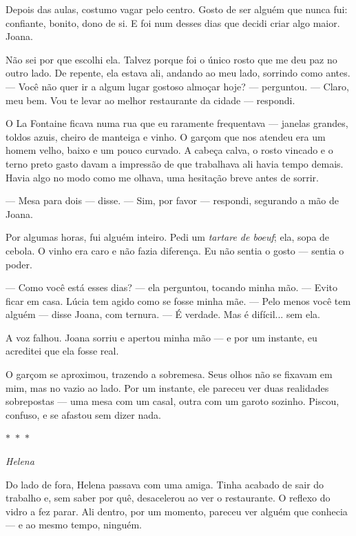 \medskip

Depois das aulas, costumo vagar pelo centro.  
Gosto de ser alguém que nunca fui: confiante, bonito, dono de si.  
E foi num desses dias que decidi criar algo maior.  
Joana.

Não sei por que escolhi ela. Talvez porque foi o único rosto que me deu paz no outro lado.  
De repente, ela estava ali, andando ao meu lado, sorrindo como antes.  
— Você não quer ir a algum lugar gostoso almoçar hoje? — perguntou.  
— Claro, meu bem. Vou te levar ao melhor restaurante da cidade — respondi.

\medskip

O La Fontaine ficava numa rua que eu raramente frequentava — janelas grandes, toldos azuis, cheiro de manteiga e vinho.  
O garçom que nos atendeu era um homem velho, baixo e um pouco curvado. A cabeça calva, o rosto vincado e o terno preto gasto davam a impressão de que trabalhava ali havia tempo demais.
Havia algo no modo como me olhava, uma hesitação breve antes de sorrir.

— Mesa para dois — disse.  
— Sim, por favor — respondi, segurando a mão de Joana.

Por algumas horas, fui alguém inteiro.  
Pedi um \emph{tartare de boeuf}; ela, sopa de cebola.  
O vinho era caro e não fazia diferença.  
Eu não sentia o gosto — sentia o poder.

— Como você está esses dias? — ela perguntou, tocando minha mão.  
— Evito ficar em casa. Lúcia tem agido como se fosse minha mãe.  
— Pelo menos você tem alguém — disse Joana, com ternura.  
— É verdade. Mas é difícil... sem ela.  

A voz falhou. Joana sorriu e apertou minha mão — e por um instante, eu acreditei que ela fosse real.

O garçom se aproximou, trazendo a sobremesa.  
Seus olhos não se fixavam em mim, mas no vazio ao lado.  
Por um instante, ele pareceu ver duas realidades sobrepostas — uma mesa com um casal, outra com um garoto sozinho.  
Piscou, confuso, e se afastou sem dizer nada.

\medskip

\begin{center}
$\ast$~$\ast$~$\ast$

\textit{Helena}
\end{center}

Do lado de fora, Helena passava com uma amiga.  
Tinha acabado de sair do trabalho e, sem saber por quê, desacelerou ao ver o restaurante.  
O reflexo do vidro a fez parar.  
Ali dentro, por um momento, pareceu ver alguém que conhecia — e ao mesmo tempo, ninguém.

